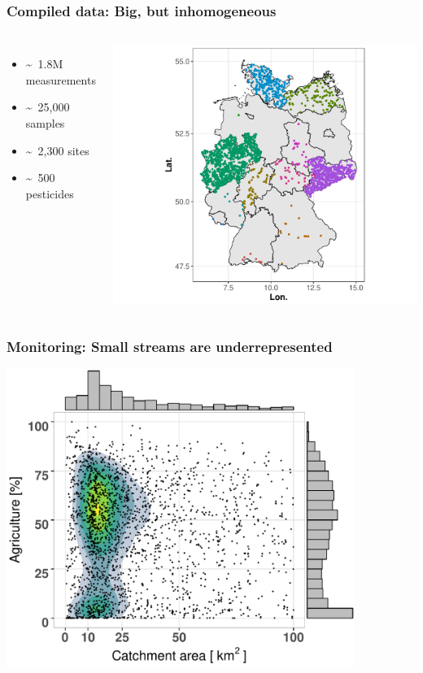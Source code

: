 \documentclass[
	12pt
	]{beamer}
\begin{document}
\begin{frame}
\frametitle{Compiled data: Big, but inhomogeneous}
	\begin{columns}
	    	\begin{itemize}
	    		\item \textasciitilde~1.8M measurements 
	    		\item \textasciitilde~25,000 samples 
	    		\item \textasciitilde~2,300 sites
	    		\item \textasciitilde~500 pesticides 
	    	\end{itemize}
	    	\vspace*{5mm}
	    	\hspace*{-10mm}\includegraphics[width = 1.4\textwidth]{figs/map_phch.pdf}
	 \end{columns}
\end{frame}


\begin{frame}
\frametitle{Monitoring: Small streams are underrepresented}
	\includegraphics[width = 0.85\textwidth]{figs/distribution.pdf}
\end{frame}
\end{document}
